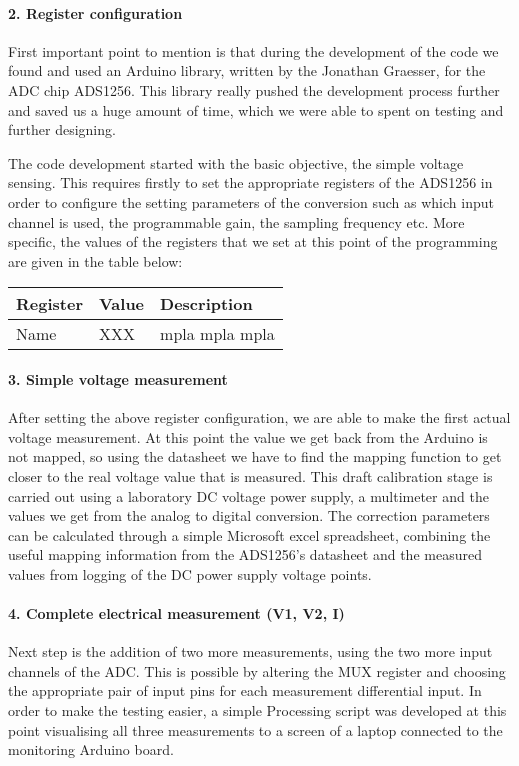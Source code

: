 \paragraph{2. Register configuration\\}
First important point to mention is that during the development of the code we found and used an Arduino library, written by the Jonathan Graesser, for the ADC chip ADS1256. This library really pushed the development process further and saved us a huge amount of time, which we were able to spent on testing and further designing.

The code development started with the basic objective, the simple voltage sensing. This requires firstly to set the appropriate registers of the ADS1256 in order to configure the setting parameters of the conversion such as which input channel is used, the programmable gain, the sampling frequency etc. More specific, the values of the registers that we set at this point of the programming are given in the table below:

\begin{center}
\begin{tabular}{ l l l } 
 Register & Value & Description \\ \hline
 Name & XXX & mpla mpla mpla
\end{tabular}
\end{center}

\paragraph{3. Simple voltage measurement\\}
After setting the above register configuration, we are able to make the first actual voltage measurement. At this point the value we get back from the Arduino is not mapped, so using the datasheet we have to find the mapping function to get closer to the real voltage value that is measured. This draft calibration stage is carried out using a laboratory DC voltage power supply, a multimeter and the values we get from the analog to digital conversion. The correction parameters can be calculated through a simple Microsoft excel spreadsheet, combining the useful mapping information from the ADS1256's datasheet and the measured values from logging of the DC power supply voltage points.

\paragraph{4. Complete electrical measurement (V1, V2, I)\\}
Next step is the addition of two more measurements, using the two more input channels of the ADC. This is possible by altering the MUX register and choosing the appropriate pair of input pins for each measurement differential input. In order to make the testing easier, a simple Processing script was developed at this point visualising all three measurements to a screen of a laptop connected to the monitoring Arduino board.

